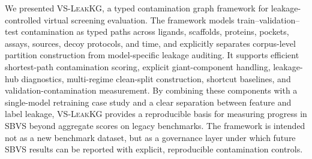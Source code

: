 \documentclass[11pt]{article}
\begin{document}
We presented \textsc{VS-LeakKG}, a typed contamination graph framework for leakage-controlled virtual screening evaluation. The framework models train--validation--test contamination as typed paths across ligands, scaffolds, proteins, pockets, assays, sources, decoy protocols, and time, and explicitly separates corpus-level partition construction from model-specific leakage auditing. It supports efficient shortest-path contamination scoring, explicit giant-component handling, leakage-hub diagnostics, multi-regime clean-split construction, shortcut baselines, and validation-contamination measurement. By combining these components with a single-model retraining case study and a clear separation between feature and label leakage, \textsc{VS-LeakKG} provides a reproducible basis for measuring progress in SBVS beyond aggregate scores on legacy benchmarks. The framework is intended not as a new benchmark dataset, but as a governance layer under which future SBVS results can be reported with explicit, reproducible contamination controls.


\end{document}
